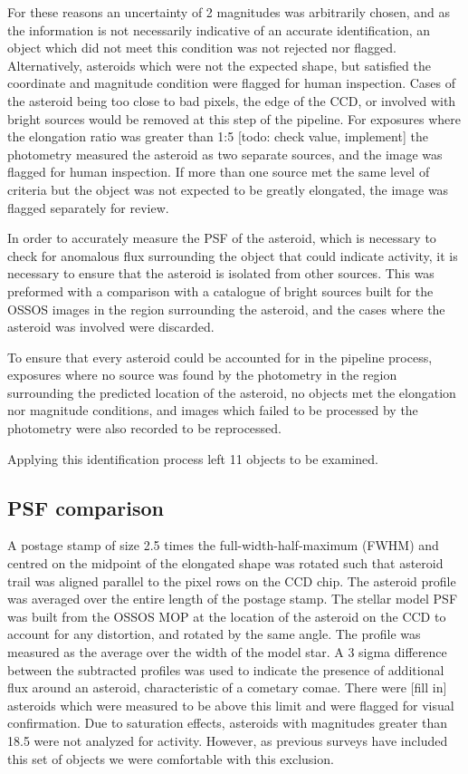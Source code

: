 \documentclass[iop,apj]{emulateapj}
\begin{document}
For these reasons an uncertainty of 2 magnitudes was arbitrarily chosen, and as the information is not necessarily indicative of an accurate identification, an object which did not meet this condition was not rejected nor flagged. Alternatively, asteroids which were not the expected shape, but satisfied the coordinate and magnitude condition were flagged for human inspection. 
Cases of the asteroid being too close to bad pixels, the edge of the CCD, or involved with bright sources would be removed at this step of the pipeline. For exposures where the elongation ratio was greater than 1:5 [todo: check value, implement] the photometry measured the asteroid as two separate sources, and the image was flagged for human inspection. If more than one source met the same level of criteria but the object was not expected to be greatly elongated, the image was flagged separately for review.

In order to accurately measure the PSF of the asteroid, which is necessary to check for anomalous flux surrounding the object that could indicate activity, it is necessary to ensure that the asteroid is isolated from other sources. This was preformed with a comparison with a catalogue of bright sources built for the OSSOS images \citep{ossos} in the region surrounding the asteroid, and the cases where the asteroid was involved were discarded.

To ensure that every asteroid could be accounted for in the pipeline process, exposures where no source was found by the photometry in the region surrounding the predicted location of the asteroid, no objects met the elongation nor magnitude conditions, and images which failed to be processed by the photometry were also recorded to be reprocessed.

Applying this identification process left 11 objects to be examined.


\subsection{PSF comparison}

A postage stamp of size 2.5 times the full-width-half-maximum (FWHM) and centred on the midpoint of the elongated shape was rotated such that asteroid trail was aligned parallel to the pixel rows on the CCD chip. The asteroid profile was averaged over the entire length of the postage stamp. The stellar model PSF was built from the OSSOS MOP at the location of the asteroid on the CCD to account for any distortion, and rotated by the same angle.  The profile was measured as the average over the width of the model star. A 3 sigma difference between the subtracted profiles was used to indicate the presence of additional flux around an asteroid, characteristic of a cometary comae. There were [fill in] asteroids which were measured to be above this limit and were flagged for visual confirmation. Due to saturation effects, asteroids with magnitudes greater than 18.5 were not analyzed for activity. However, as previous surveys have included this set of objects \citep{hsieh15} we were comfortable with this exclusion.
\end{document}
